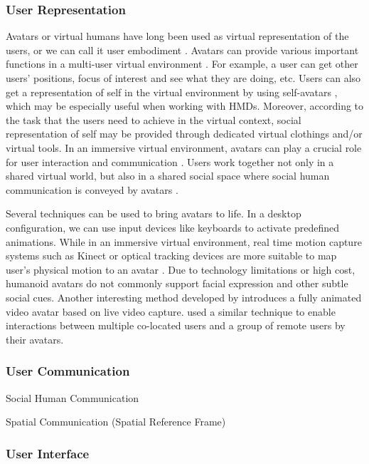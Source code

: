 \subsubsection{User Representation}
Avatars or virtual humans have long been used as virtual representation of the users, or we can call it user embodiment \citep{Benford1995UEC}. Avatars can provide various important functions in a multi-user virtual environment \citep{Thalmann2001VHR}. For example, a user can get other users' positions, focus of interest and see what they are doing, etc. Users can also get a representation of self in the virtual environment by using self-avatars \citep{Lok2003Effects}, which may be especially useful when working with HMDs. Moreover, according to the task that the users need to achieve in the virtual context, social representation of self may be provided through dedicated virtual clothings and/or virtual tools. In an immersive virtual environment, avatars can play a crucial role for user interaction and communication \citep{Slater1994Body}. Users work together not only in a shared virtual world, but also in a shared social space where social human communication is conveyed by avatars \citep{Roberts2004SSH}.

Several techniques can be used to bring avatars to life. In a desktop configuration, we can use input devices like keyboards to activate predefined animations. While in an immersive virtual environment, real time motion capture systems such as Kinect or optical tracking devices are more suitable to map user's physical motion to an avatar \citep{Mohler2010Effect, Vera2011AugMir, Normand2012FBA}. Due to technology limitations or high cost, humanoid avatars do not commonly support facial expression and other subtle social cues. Another interesting method developed by \citet{Ogi2001SteAva} introduces a fully animated video avatar based on live video capture. \citet{Beck2013IGG} used a similar technique to enable interactions between multiple co-located users and a group of remote users by their avatars.

\subsubsection{User Communication}
Social Human Communication

Spatial Communication (Spatial Reference Frame)

\subsubsection{User Interface}
